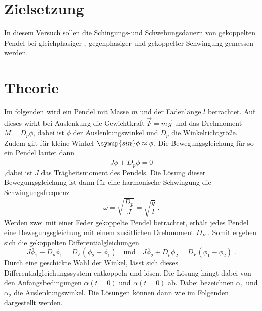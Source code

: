 \section{Zielsetzung}
In diesem Versuch sollen die Schingungs-und Schwebungsdauern von
gekoppelten Pendel bei gleichphasiger , gegenphasiger und gekoppelter
Schwingung gemessen werden.
\section{Theorie}
\label{sec:Theorie}
Im folgenden wird ein Pendel mit Masse $m$ und der Fadenlänge $l$
betrachtet. Auf dieses wirkt bei Auslenkung die Gewichtkraft $\vec{F} = m\vec{g}$
und das Drehmoment $ M = D_p \phi $, dabei ist $\phi$ der Auslenkungswinkel
und $D_p$ die Winkelrichtgröße. Zudem gilt für kleine Winkel $\symup{sin}\phi
\approx \phi$. Die Bewegungsgleichung für so ein Pendel lautet dann
\begin{equation*}
  J \ddot{\phi} + D_p \phi = 0
\end{equation*}
,dabei ist $J$ das Trägheitsmoment des Pendels. Die Lösung dieser Bewegungsgleichung
ist dann für eine harmonische Schwingung die Schwingungsfrequenz
\begin{equation}
  \omega = \sqrt{\frac{D_p}{J}} = \sqrt{\frac{g}{l}}\;.
  \label{eqn:l1}
\end{equation}
Werden zwei mit einer Feder gekoppelte Pendel betrachtet,
erhält jedes Pendel eine Bewegungsgleichung
mit einem zusätlichen Drehmoment $D_F$ . Somit ergeben sich die gekoppelten
Differentialgleichungen
\begin{equation*}
J \ddot{\phi_1} + D_p \phi_1 = D_F( \phi_2 - \phi_1) \quad \text{und} \quad
J \ddot{\phi_2} + D_p \phi_2 = D_F( \phi_1 - \phi_2)\;.
\end{equation*}
Durch eine geschickte Wahl der Winkel, lässt sich dieses
Differentialgleichungssystem entkoppeln und lösen. Die Lösung hängt dabei von
den Anfangsbedingungen $\alpha(t=0)$ und $\dot{\alpha}(t=0)$ ab. Dabei bezeichnen
$\alpha_1$ und $\alpha_2$ die Auslenkungswinkel.
Die Lösungen können dann wie im Folgenden dargestellt werden.
